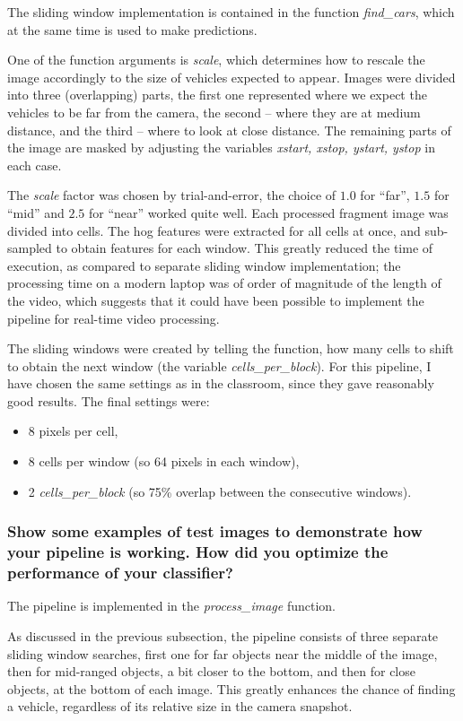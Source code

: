 \documentclass[a4paper,10pt]{article}
\begin{document}
The sliding window implementation is contained in the function \emph{find\_cars},
which at the same time is used to make predictions.

One of the function arguments is \emph{scale}, which determines how to rescale 
the image accordingly to the size of vehicles expected to appear.
Images were divided into three (overlapping) parts, the first one represented where we expect the vehicles to be far from the camera,
the second -- where they are at medium distance, and the third -- where to look at close distance.
The remaining parts of the image are masked by adjusting the variables \emph{xstart, xstop, ystart, ystop} in each case.

The \emph{scale} factor was chosen by trial-and-error, the choice of $1.0$ for ``far'', $1.5$ for ``mid'' and $2.5$ for ``near'' worked quite well.
Each processed fragment image was divided into cells.
The hog features were extracted for all cells at once, and sub-sampled to obtain features for each window.
This greatly reduced the time of execution, as compared to separate sliding window implementation; the processing time on a modern laptop was of order of magnitude of the length of the video,
which suggests that it could have been possible to implement the pipeline for real-time video processing.

The sliding windows were created by telling the function, how many cells to shift to obtain the next window (the variable \emph{cells\_per\_block}).
For this pipeline, I have chosen the same settings as in the classroom, since they gave reasonably good results.
The final settings were:
%
\begin{itemize}
  \item 8 pixels per cell,
  \item 8 cells per window (so 64 pixels in each window),
  \item 2 \emph{cells\_per\_block} (so 75\% overlap between the consecutive windows).
\end{itemize}

\subsubsection{Show some examples of test images to demonstrate how your pipeline is working. How did you optimize the performance of your classifier?}\label{subsection}

The pipeline is implemented in the \emph{process\_image} function.

As discussed in the previous subsection, the pipeline consists of three separate sliding window searches,
first one for far objects near the middle of the image, then for mid-ranged objects, a bit closer to the bottom,
and then for close objects, at the bottom of each image. This greatly enhances the chance of finding a vehicle,
regardless of its relative size in the camera snapshot.
\end{document}
